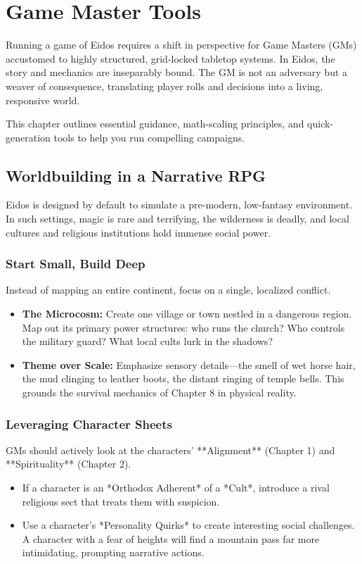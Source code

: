 \chapter{Game Master Tools}

Running a game of Eidos requires a shift in perspective for Game Masters (GMs) accustomed to highly structured, grid-locked tabletop systems. In Eidos, the story and mechanics are inseparably bound. The GM is not an adversary but a weaver of consequence, translating player rolls and decisions into a living, responsive world. 

This chapter outlines essential guidance, math-scaling principles, and quick-generation tools to help you run compelling campaigns.

\section{Worldbuilding in a Narrative RPG}

Eidos is designed by default to simulate a pre-modern, low-fantasy environment. In such settings, magic is rare and terrifying, the wilderness is deadly, and local cultures and religious institutions hold immense social power.

\subsection{Start Small, Build Deep}
Instead of mapping an entire continent, focus on a single, localized conflict.
\begin{itemize}
    \item \textbf{The Microcosm:} Create one village or town nestled in a dangerous region. Map out its primary power structures: who runs the church? Who controls the military guard? What local cults lurk in the shadows?
    \item \textbf{Theme over Scale:} Emphasize sensory details—the smell of wet horse hair, the mud clinging to leather boots, the distant ringing of temple bells. This grounds the survival mechanics of Chapter 8 in physical reality.
\end{itemize}

\subsection{Leveraging Character Sheets}
GMs should actively look at the characters' **Alignment** (Chapter 1) and **Spirituality** (Chapter 2).
\begin{itemize}
    \item If a character is an *Orthodox Adherent* of a *Cult*, introduce a rival religious sect that treats them with suspicion.
    \item Use a character's *Personality Quirks* to create interesting social challenges. A character with a fear of heights will find a mountain pass far more intimidating, prompting narrative actions.
\end{itemize}

